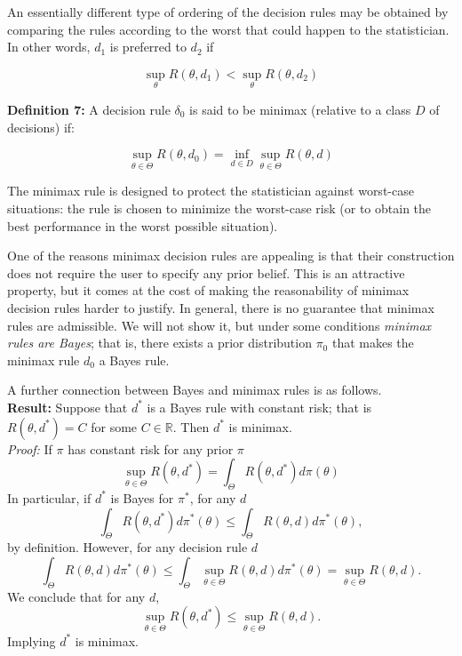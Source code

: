 \documentclass[11pt]{article} %
\begin{document}
An essentially different type of ordering of the decision rules may be obtained by comparing the rules according to the worst that could happen to the statistician. In other words, $d_1$ is preferred to $d_2$ if

\[ \sup_{\theta} R(\theta, d_1) < \sup_{\theta} R(\theta, d_2) \]

\noindent \textbf{Definition 7:} A decision rule $\delta_0$ is said to be minimax (relative to a class $D$ of decisions) if:

\[ \sup_{\theta \in \Theta} R(\theta, d_0) = \inf_{d \in D} \sup_{\theta \in \Theta} R(\theta, d) \] 

The minimax rule is designed to protect the statistician against worst-case situations: the rule is chosen to minimize the worst-case risk (or to obtain the best performance in the worst possible situation). 

One of the reasons minimax decision rules are appealing is that their construction does not require the user to specify any prior belief. This is an attractive property, but it comes at the cost of making the reasonability of minimax decision rules harder to justify. In general, there is no guarantee that minimax rules are admissible. We will not show it, but under some conditions \emph{minimax rules are Bayes}; that is, there exists a prior distribution $\pi_0$ that makes the minimax rule $d_0$ a Bayes rule. 

A further connection between Bayes and minimax rules is as follows. \\

\noindent \textbf{Result:} Suppose that $d^*$ is a Bayes rule with constant risk; that is $R(\theta, d^*)= C$ for some $C \in \mathbb{R}$. Then $d^*$ is minimax. \\

\noindent \emph{Proof:} If $\pi$ has constant risk for any prior $\pi$
\[ \sup_{\theta \in \Theta} R(\theta, d^*) = \int_{\Theta} R(\theta, d^*) d \pi(\theta)   \]
 In particular, if $d^*$ is Bayes for $\pi^*$, for any $d$
 \[  \int_{\Theta} R(\theta, d^*) d \pi^*(\theta) \leq \int_{\Theta} R(\theta, d) d \pi^*(\theta),    \]
by definition. However, for any decision rule $d$
 \[  \int_{\Theta} R(\theta, d) d \pi^*(\theta) \leq \int_{\Theta} \sup_{\theta \in \Theta} R(\theta, d) d \pi^*(\theta) = \sup_{\theta \in \Theta} R(\theta,d).    \]
 We conclude that for any $d$,
 \[\sup_{\theta \in \Theta} R(\theta, d^*) \leq  \sup_{\theta \in \Theta} R(\theta,d).  \]
Implying $d^*$ is minimax. 



\newpage 



\end{document}
